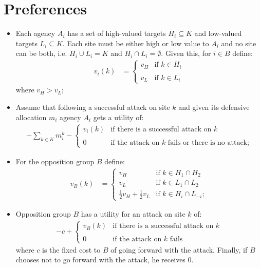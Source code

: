 \documentclass[12pt]{article}
\begin{document}
\section*{Preferences}

\begin{itemize}

\item Each agency $A_i$ has a set of high-valued targets $H_i\subseteq K$ and low-valued targets $L_i\subseteq K$.  Each site must be either high or low value to $A_i$ and no site can be both, i.e. $H_i \cup L_i = K$ and $H_i \cap L_i = \emptyset$.  Given this, for $i\in B$ define:
\begin{align*}
v_i(k)&=\left\{\begin{array}{ll}
v_H&\mbox{if }k\in H_i\\
&\\
v_L&\mbox{if }k\in L_i
\end{array}\right.
\end{align*}where $v_H>v_L$;

\item Assume that following a successful attack on site $k$ and given its defensive allocation $m_i$ agency $A_i$ gets a utility of:
\begin{align*}
-\sum_{k\in K} m_i^k-\left\{\begin{array}{ll}
v_i(k)&\mbox{if there is a successful attack on }k\\
&\\
0&\mbox{if the attack on $k$ fails or there is no attack;}
\end{array}\right.
\end{align*}

\item For the opposition group $B$ define:
\begin{align*}
v_B(k)&=\left\{\begin{array}{ll}
v_H& \mbox{if $k \in H_1 \cap H_2$} \\
v_L& \mbox{if $k \in L_1 \cap L_2$} \\
\frac{1}{2} v_H + \frac{1}{2} v_L& \mbox{if }k\in H_i\cap L_{-i};
\end{array}\right.
\end{align*}

\item Opposition group $B$ has a utility for an attack on site $k$ of:
\begin{align*}
-c+\left\{\begin{array}{ll}
v_B(k)&\mbox{if there is a successful attack on }k\\
&\\
0&\mbox{if the attack on $k$ fails}
\end{array}\right.
\end{align*}where $c$ is the fixed cost to $B$ of going forward with the attack.  Finally, if $B$ chooses not to go forward with the attack, he receives 0.

\end{itemize}
\end{document}

